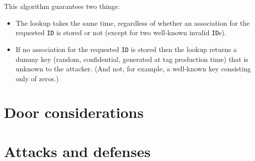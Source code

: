 \documentclass[a4paper,10pt]{scrartcl}
\begin{document}
This algorithm guarantees two things: \begin{itemize}
  \item The lookup takes the same time, regardless of whether an association for the requested \texttt{ID} is stored or not (except for two well-known invalid \texttt{ID}s).
  \item If no association for the requested \texttt{ID} is stored then the lookup returns a dummy key (random, confidential, generated at tag production time) that is unknown to the attacker. (And not, for example, a well-known key consisting only of zeros.)
\end{itemize}

 
\section{Door considerations}

\section{Attacks and defenses}
\end{document}
